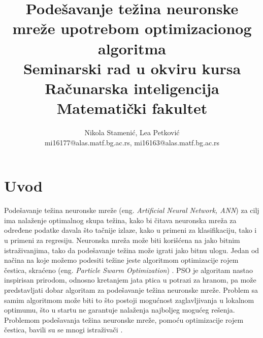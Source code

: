 \documentclass[a4paper]{article}
\begin{document}
\title{Podešavanje težina neuronske mreže upotrebom optimizacionog algoritma\\ \small{Seminarski rad u okviru kursa\\Računarska inteligencija\\ Matematički fakultet}}

\author{Nikola Stamenić, Lea Petković\\ mi16177@alas.matf.bg.ac.rs, mi16163@alas.matf.bg.ac.rs}

\maketitle

\tableofcontents

\newpage

\section{Uvod}
\label{sec:uvod}

Podešavanje težina neuronske mreže (eng. \emph{Artificial Neural Network, ANN}) za cilj ima nalaženje optimalnog skupa težina, kako bi čitava neuronska mreža za određene podatke davala što
tačnije izlaze, kako u primeni za klasifikaciju, tako i u primeni za regresiju. Neuronska mreža može biti korišćena na jako
bitnim istraživanjima, tako da podešavanje težina može igrati jako bitnu ulogu. Jedan od načina na koje možemo podesiti težine jeste algoritmom optimizacije rojem čestica, skraćeno (eng.
\emph{Particle Swarm Optimization}) \cite{PSOANN}. PSO je algoritam nastao inspirisan prirodom, odnosno kretanjem jata ptica u potrazi za hranom, pa može predstavljati dobar algoritam za
podešavanje težina neuronske mreže. Problem sa samim algoritmom može biti to što postoji mogućnost zaglavljivanja u lokalnom optimumu, što u startu ne garantuje nalaženja najboljeg mogućeg
rešenja. Problemom podešavanja težina neuronske mreže, pomoću optimizacije rojem čestica, bavili su se mnogi istraživači \cite{hindawi}.
\end{document}
